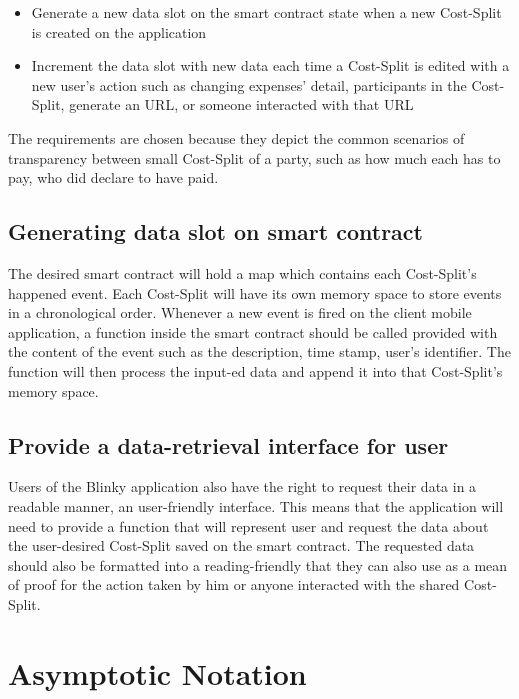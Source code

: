 \documentclass[twoside,draftfooter]{tutthesis} %
\begin{document}
\begin{itemize}
    \item Generate a new data slot on the smart contract state when a new Cost-Split is created on the application
    \item Increment the data slot with new data each time a Cost-Split is edited with a new user's action such as changing expenses' detail, participants in the Cost-Split, generate an URL, or someone interacted with that URL
\end{itemize}

The requirements are chosen because they depict the common scenarios of transparency between small Cost-Split of a party, such as how much each has to pay, who did declare to have paid.

\subsection{Generating data slot on smart contract}

The desired smart contract will hold a map which contains each Cost-Split's happened event. Each Cost-Split will have its own memory space to store events in a chronological order. Whenever a new event is fired on the client mobile application, a function inside the smart contract should be called provided with the content of the event such as the description, time stamp, user's identifier. The function will then process the input-ed data and append it into that Cost-Split's memory space.

\subsection{Provide a data-retrieval interface for user}

Users of the Blinky application also have the right to request their data in a readable manner, an user-friendly interface. This means that the application will need to provide a function that will represent user and request the data about the user-desired Cost-Split saved on the smart contract. The requested data should also be formatted into a reading-friendly that they can also use as a mean of proof for the action taken by him or anyone interacted with the shared Cost-Split.

\section{Asymptotic Notation}
\end{document}
